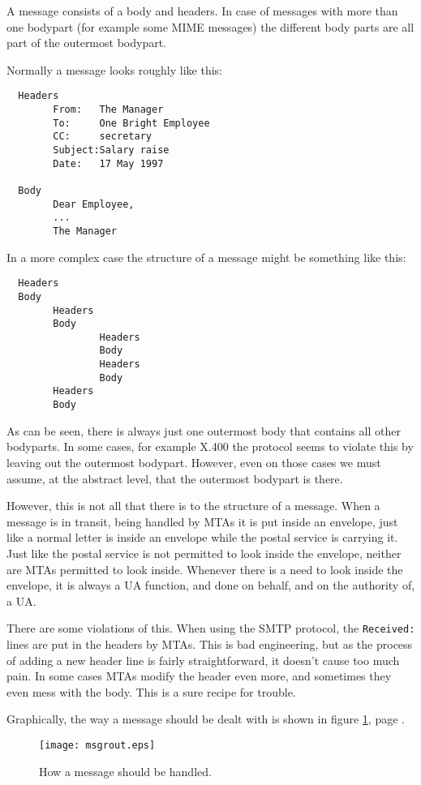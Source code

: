 A message consists of a body and headers. In case of messages with more 
than one bodypart (for example some MIME messages) the different body 
parts are all part of the outermost bodypart.

Normally a message looks roughly like this:

\begin{verbatim}
  Headers
        From:   The Manager
        To:     One Bright Employee
        CC:     secretary
        Subject:Salary raise
        Date:   17 May 1997

  Body
        Dear Employee,
        ...
        The Manager
\end{verbatim}

In a more complex case the structure of a message might be something like this:

\begin{verbatim}
  Headers
  Body
        Headers
        Body
                Headers
                Body
                Headers
                Body
        Headers
        Body
\end{verbatim}

As can be seen, there is always just one outermost body that contains 
all other bodyparts. In some cases, for example X.400 the protocol 
seems to violate this by leaving out the outermost bodypart. However, 
even on those cases we must assume, at the abstract level, 
that the outermost bodypart is there.

However, this is not all that there is to the structure of a message. 
When a message is in transit, being handled by MTAs it is put inside 
an envelope, just like a normal letter is inside an envelope while 
the postal service is carrying it. Just like the postal service is not 
permitted to look inside the envelope, neither are MTAs permitted 
to look inside. Whenever there is a need to look inside the envelope, 
it is always a UA function, and done on behalf, and on the authority of, a UA.

There are some violations of this. When using the SMTP protocol, the 
{\tt Received:} lines are put in the headers by MTAs. This is bad 
engineering, but as the process of adding a new header line is fairly 
straightforward, it doesn't cause too much pain. In some cases MTAs 
modify the header even more, and sometimes they even mess with the body. 
This is a sure recipe for trouble.



Graphically, the way a message should be dealt with is shown 
in figure
 \ref{fig:msgrout}, page \pageref{fig:msgrout}.
\begin{figure}[ht]
  \centering
  \texttt{[image: msgrout.eps]}
  \caption{\label{fig:msgrout}How a message should be handled.}
\end{figure}

